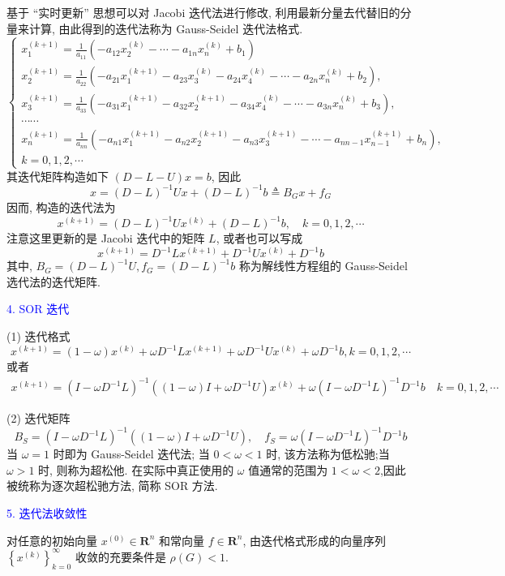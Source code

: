 基于 “实时更新” 思想可以对 Jacobi 迭代法进行修改, 利用最新分量去代替旧的分量来计算, 由此得到的迭代法称为 Gauss-Seidel 迭代法格式.
$$
\left\{\begin{array}{l} 
x_{1}^{(k+1)}= \frac{1}{a_{11}}\left(-a_{12} x_{2}^{(k)}-\cdots-a_{1 n} x_{n}^{(k)}+b_{1}\right) \\
x_{2}^{(k+1)}= \frac{1}{a_{22}}\left(-a_{21} x_{1}^{(k+1)}-a_{23} x_{3}^{(k)}-a_{24} x_{4}^{(k)}-\cdots-a_{2 n} x_{n}^{(k)}+b_{2}\right), \\
x_{3}^{(k+1)}= \frac{1}{a_{33}}\left(-a_{31} x_{1}^{(k+1)}-a_{32} x_{2}^{(k+1)}-a_{34} x_{4}^{(k)}-\cdots-a_{3 n} x_{n}^{(k)}+b_{3}\right), \\
\cdots \cdots \\
x_{n}^{(k+1)}= \frac{1}{a_{n n}}\left(-a_{n 1} x_{1}^{(k+1)}-a_{n 2} x_{2}^{(k+1)}-a_{n 3} x_{3}^{(k+1)}-\cdots-a_{n n-1} x_{n-1}^{(k+1)}+b_{n}\right), \\
k=0,1,2, \cdots
\end{array}\right.
$$
其迭代矩阵构造如下 $ (D-L-U) x=b $, 因此
$$
x=(D-L)^{-1} U x+(D-L)^{-1} b \triangleq B_{G} x+f_{G}
$$
因而, 构造的迭代法为
$$
x^{(k+1)}=(D-L)^{-1} U x^{(k)}+(D-L)^{-1} b, \quad k=0,1,2, \cdots
$$
注意这里更新的是 Jacobi 迭代中的矩阵 $ L $, 或者也可以写成
$$
x^{(k+1)}=D^{-1} L x^{(k+1)}+D^{-1} U x^{(k)}+D^{-1} b
$$
其中, $ B_{G}=(D-L)^{-1} U, f_{G}=(D-L)^{-1} b $ 称为解线性方程组的 Gauss-Seidel 选代法的迭代矩阵.

\textcolor{blue}{4. SOR 迭代}

(1) 迭代格式
$$
x^{(k+1)}=(1-\omega) x^{(k)}+\omega D^{-1} L x^{(k+1)}+\omega D^{-1} U x^{(k)}+\omega D^{-1} b, k=0,1,2, \cdots
$$
或者
$$
\begin{array}{c}
x^{(k+1)}=\left(I-\omega D^{-1} L\right)^{-1}\left((1-\omega) I+\omega D^{-1} U\right) x^{(k)}+\omega\left(I-\omega D^{-1} L\right)^{-1} D^{-1} b \quad k=0,1,2, \cdots
\end{array}
$$

(2) 迭代矩阵
$$
B_{S}=\left(I-\omega D^{-1} L\right)^{-1}\left((1-\omega) I+\omega D^{-1} U\right), \quad f_{S}=\omega\left(I-\omega D^{-1} L\right)^{-1} D^{-1} b
$$
当 $ \omega=1 $ 时即为 Gauss-Seidel 迭代法; 当 $ 0<\omega<1 $ 时, 该方法称为低松驰;当 $ \omega>1 $ 时, 则称为超松他. 在实际中真正使用的 $ \omega $ 值通常的范围为 $ 1<\omega<2 $,因此被统称为逐次超松驰方法, 简称 SOR 方法.

\textcolor{blue}{5. 迭代法收敛性}

对任意的初始向量 $ x^{(0)} \in \mathbf{R}^{n} $ 和常向量 $ f \in \mathbf{R}^{n} $, 由迭代格式形成的向量序列 $ \left\{x^{(k)}\right\}_{k=0}^{\infty} $ 收敛的充要条件是 $ \rho(G)<1 $.

